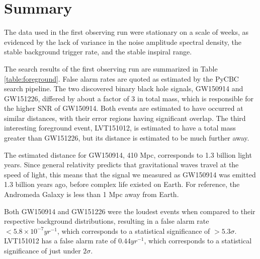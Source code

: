 \section{Summary}

The data used in the first observing run were stationary on a scale of 
weeks, as evidenced by the lack of variance in the noise amplitude 
spectral density, the stable background trigger rate, and the stable 
inspiral range.

The search results of the first observing run are summarized in Table 
\ref{table:foreground}. False alarm rates are quoted as estimated by the 
PyCBC search pipeline.  
The two discovered binary black hole signals, GW150914 and GW151226, differed 
by about a factor of 3 in total mass, which is responsible for the higher SNR  
of GW150914. Both events are estimated to have occurred at similar distances, 
with their error regions having significant overlap. 
The third interesting foreground event,
LVT151012, is estimated to have a total mass greater than GW151226, but its
distance is estimated to be much further away.

The estimated distance for 
GW150914, 410 Mpc, corresponds to 1.3 billion light years. Since general 
relativity predicts that gravitational waves travel at the speed of light, 
this means that the signal we measured as GW150914 was emitted 1.3 billion 
years ago, before complex life existed on Earth. For reference, 
the Andromeda Galaxy is less than 1 Mpc away from Earth. 

Both GW150914 and GW151226 were the loudest events when compared to their 
respective background distributions, resulting in a false alarm rate 
$< 5.8\times10^{-7} yr^{-1}$, which corresponds to a statistical significance of 
$> 5.3\sigma$. LVT151012 has a false alarm rate of $0.44 yr^{-1}$, which 
corresponds to a statistical significance of just under $2\sigma$.

